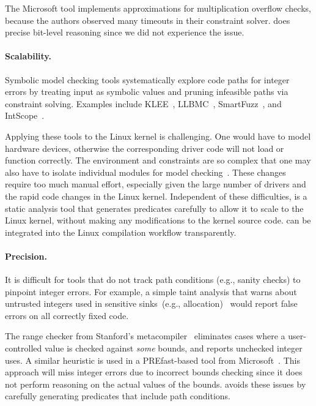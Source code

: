 The Microsoft tool implements approximations for multiplication
overflow checks, because the authors observed many timeouts in their
constraint solver.  \sys does precise bit-level reasoning
since we did not experience the issue.
\fi


\paragraph{Scalability.}
Symbolic model checking tools systematically explore code paths
for integer errors by treating input as symbolic values and pruning
infeasible paths via constraint solving.  Examples include
KLEE~\cite{cadar:klee},
LLBMC~\cite{llbmc},
SmartFuzz~\cite{molnar:catchconv},
and
IntScope~\cite{intscope}.

Applying these tools to the Linux kernel is challenging.  One would
have to model hardware devices, otherwise the corresponding driver
code will not load or function correctly.  The environment and
constraints are so complex that one may also have to isolate
individual modules for model checking~\cite{engler:vs}.  These
changes require too much manual effort, especially given the
large number of drivers and the rapid code changes in the Linux
kernel.
%
Independent of these difficulties, \sys is a static analysis tool that
generates predicates carefully to allow it to scale to the Linux kernel,
without making any modifications to the kernel source code. \sys can be
integrated into the Linux compilation workflow transparently.

\paragraph{Precision.}
It is difficult for tools that do not track path conditions (e.g.,
sanity checks) to pinpoint integer errors.  For example, a simple
taint analysis that warns about untrusted integers used in sensitive
sinks~(e.g., allocation)~\cite{cqual, lclint} would report false
errors on all correctly fixed code.

The range checker from Stanford's metacompiler~\cite{range-checker}
eliminates cases where a user-controlled value is checked against
\emph{some} bounds, and reports unchecked integer uses.  A similar heuristic
is used in a PREfast-based tool from Microsoft~\cite{prefast}.  This
approach will miss integer errors due to incorrect bounds checking since
it does not perform reasoning on the actual values of the bounds. \sys avoids
these issues by carefully generating predicates that include path conditions.

